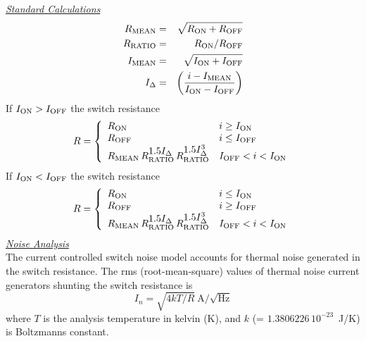 \noindent\underline{\sl \large Standard Calculations}\\[0.1in]
\begin{eqnarray}
R_{\mbox{\scriptsize MEAN}} & = & \sqrt{R_{\mbox{\scriptsize ON}} + R_{\mbox{\scriptsize OFF}}} \\
R_{\mbox{\scriptsize RATIO}}& = &       R_{\mbox{\scriptsize ON}}/ R_{\mbox{\scriptsize OFF}} \\
I_{\mbox{\scriptsize MEAN}} & = & \sqrt{I_{\mbox{\scriptsize ON}} + I_{\mbox{\scriptsize OFF}}} \\
I_{\Delta}& = & \left({{\textstyle i - I_{\mbox{\scriptsize MEAN}}} \over
              {\textstyle I_{\mbox{\scriptsize ON}}- I_{\mbox{\scriptsize OFF}}}}\right)
\end{eqnarray}
If $I_{\mbox{\scriptsize ON}}> I_{\mbox{\scriptsize OFF}}$
the switch resistance
\begin{equation}
R = \left\{
\begin{array}{ll}
R_{\ms{ON}}                            & i \ge I_{\ms{ON}} \\
R_{\ms{OFF}}                            & i \le I_{\ms{OFF}}\\
R_{\ms{MEAN}}\,
  R_{\ms{RATIO}}^{\textstyle 1.5 I_{\Delta}}\,
  R_{\ms{RATIO}}^{\textstyle 1.5 I_{\Delta}^3}
  & I_{\ms{OFF}} < i < I_{\ms{ON}} \\
\end{array} \right. %
\end{equation}
If $I_{\mbox{\scriptsize ON}}< I_{\mbox{\scriptsize OFF}}$
the switch resistance
\begin{equation}
R = \left\{
\begin{array}{ll}
R_{\ms{ON}}                            & i \le I_{\ms{ON}} \\
R_{\ms{OFF}}                            & i \ge I_{\ms{OFF}}\\
R_{\ms{MEAN}}\,
  R_{\ms{RATIO}}^{\textstyle 1.5 I_{\Delta}}\,
  R_{\ms{RATIO}}^{\textstyle 1.5 I_{\Delta}^3}
  & I_{\ms{OFF}} < i < I_{\ms{ON}} \\
\end{array} \right. %
\end{equation}
\noindent\underline{\sl \large Noise Analysis}\\[0.1in]
The current controlled switch noise model accounts for thermal noise generated
in the switch resistance.
The rms (root-mean-square) values of
thermal noise current generators shunting the switch resistance is
\begin{equation}
I_{n} = \sqrt{4kT/R}~\mbox{A/}\sqrt{\mbox{Hz}}
\end{equation}
where $T$ is the analysis temperature in kelvin (K), and $k$ (=
$1.3806226\,10^{-23}$~J/K) is Boltzmanns constant.
